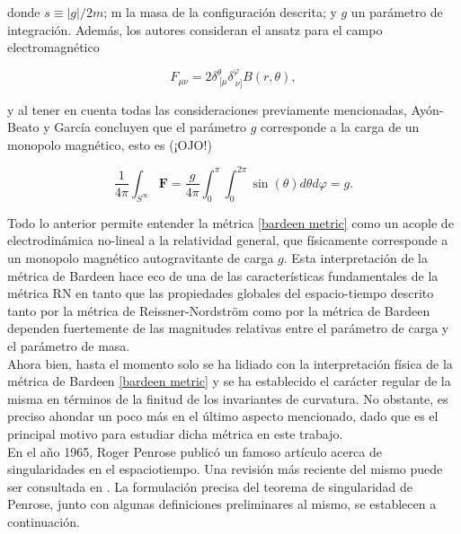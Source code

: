 \documentclass{article}
\numberwithin{equation}{section}
\theoremstyle{definition}
\begin{document}
donde $s \equiv |g|/2m$; m la masa de la configuración descrita; y $g$ un parámetro de integración. Además, los autores consideran el ansatz para el campo electromagnético 

\begin{equation}
F_{\mu \nu} = 2 \delta^{\theta}_{\ \lbrack\mu} \delta^{\varphi}_{\ \nu\rbrack} B(r, \theta),
\end{equation}

y al tener en cuenta todas las consideraciones previamente mencionadas, Ayón-Beato y García concluyen que el parámetro $g$ corresponde a la carga de un monopolo magnético, esto es (¡OJO!)

\begin{equation}
\frac{1}{4 \pi} \int_{S^{\infty}}\mathbf{F} = \frac{g}{4 \pi} \int_{0}^{\pi}\int_{0}^{2\pi}\sin (\theta) d\theta d\varphi = g.
\end{equation}

Todo lo anterior permite entender la métrica \eqref{bardeen metric} como un acople de electrodinámica no-lineal a la relatividad general, que físicamente corresponde a un monopolo magnético autogravitante de carga $g$. Esta interpretación de la métrica de Bardeen hace eco de una de las características fundamentales de la métrica RN en tanto que las propiedades globales del espacio-tiempo descrito tanto por la métrica de Reissner-Nordström como por la métrica de Bardeen dependen fuertemente de las magnitudes relativas entre el parámetro de carga y el parámetro de masa.\\

Ahora bien, hasta el momento solo se ha lidiado con la interpretación física de la métrica de Bardeen \eqref{bardeen metric} y se ha establecido el carácter regular de la misma en términos de la finitud de los invariantes de curvatura. No obstante, es preciso ahondar un poco más en el último aspecto mencionado, dado que es el principal motivo para estudiar dicha métrica en este trabajo.\\

En el año 1965, Roger Penrose publicó un famoso artículo \cite{penrose} acerca de singularidades en el espaciotiempo. Una revisión más reciente del mismo puede ser consultada en \cite{senovilla2015}. La formulación precisa del teorema de singularidad de Penrose, junto con algunas definiciones preliminares al mismo, se establecen a continuación. 
\end{document}
